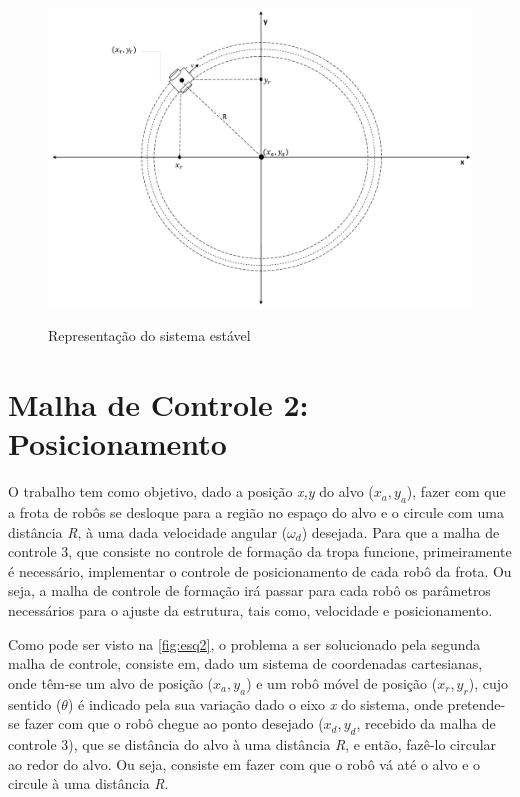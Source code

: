 \begin{figure}[!htb]
	\centering
	\caption{Representação do sistema estável}
	\includegraphics[width=1.0\textwidth]{./04-figuras/sistEstavel2}
	\label{fig:sistEst}
\end{figure}

\section{Malha de Controle 2: Posicionamento}
\label{sec:malha2 } 
O trabalho tem como objetivo, dado a posição \emph{x,y} do alvo ($x_{a},y_{a}$), fazer com que a frota de robôs se desloque para a região no espaço do alvo e o circule com uma distância \emph{R}, à uma dada velocidade angular ($\omega_{d}$) desejada. Para que a malha de controle 3, que consiste no controle de formação da tropa funcione, primeiramente é necessário, implementar o controle de posicionamento de cada robô da frota. Ou seja, a malha de controle de formação irá passar para cada robô os parâmetros necessários para o ajuste da estrutura, tais como, velocidade e posicionamento.%

Como pode ser visto na \autoref{fig:esq2}, o problema a ser solucionado pela segunda malha de controle, consiste em, dado um sistema de coordenadas cartesianas, onde têm-se um alvo de posição (\emph{$x_{a},y_{a}$}) e um robô móvel de posição (\emph{$x_{r},y_{r}$}), cujo sentido (\emph{$\theta$}) é indicado pela sua variação dado o eixo \emph{x} do sistema, onde pretende-se fazer com que o robô chegue ao ponto desejado (\emph{$x_{d},y_{d}$}, recebido da malha de controle 3), que se distância do alvo à uma distância \emph{R}, e então, fazê-lo circular ao redor do alvo. Ou seja, consiste em fazer com que o robô vá até o alvo e o circule à uma distância \emph{R}.
	   
